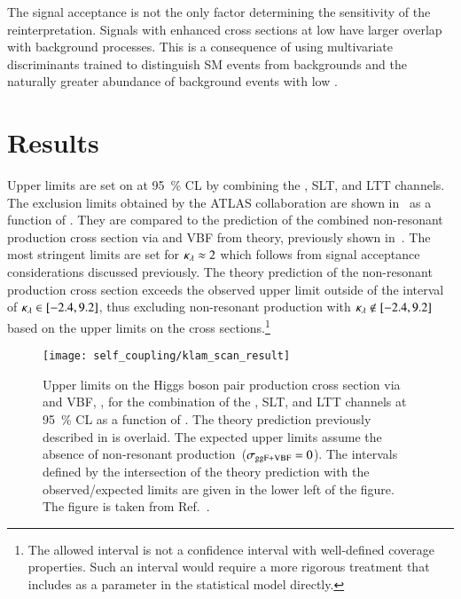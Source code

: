 The signal acceptance is not the only factor determining the
sensitivity of the reinterpretation. Signals with enhanced cross
sections at low \mHH have larger overlap with background
processes. This is a consequence of using multivariate discriminants
trained to distinguish SM \HH events from backgrounds and the
naturally greater abundance of background events with low \mHH.


\section{Results}%
\label{sec:reinterpretation_results}

Upper limits are set on \xsecggfvbf at \SI{95}{\percent} CL by
combining the \hadhad, \lephad SLT, and \lephad LTT channels. The
exclusion limits obtained by the ATLAS collaboration are shown
in~ as a function of \klambda. They are
compared to the prediction of the combined non-resonant \HH production
cross section via \ggF and VBF from theory, previously shown
in~. The most stringent limits are set for
$\kappa_{\lambda} \approx 2$ which follows from signal acceptance
considerations discussed previously. The theory prediction of the
non-resonant \HH production cross section exceeds the observed upper
limit outside of the interval of \mbox{$\kappa_{\lambda} \in [-2.4, 9.2]$},
thus excluding non-resonant \HH production with
\mbox{$\kappa_{\lambda} \notin [-2.4, 9.2]$} based on the upper limits on the
cross sections.\footnote{The allowed \klambda interval is not a
  confidence interval with well-defined coverage properties. Such an
  interval would require a more rigorous treatment that includes
  \klambda as a parameter in the statistical model directly.}

\begin{figure}[htbp]
  \centering

  \texttt{[image: self\_coupling/klam\_scan\_result]}

  \caption{Upper limits on the Higgs boson pair production cross
    section via \ggF and VBF, \xsecggfvbf, for the combination of the
    \hadhad, \lephad SLT, and \lephad LTT channels at
    \SI{95}{\percent} CL as a function of \klambda. The theory
    prediction previously described in  is
    overlaid. The expected upper limits assume the absence of
    non-resonant \HH production~($\sigma_{\text{ggF+VBF}} = 0$). The \klambda
    intervals defined by the intersection of the theory prediction
    with the observed/expected limits are given in the lower left of
    the figure. The figure is taken from
    Ref.~\cite{ATLAS-CONF-2021-052}.}%
  \label{fig:klambda_scan}
\end{figure}


